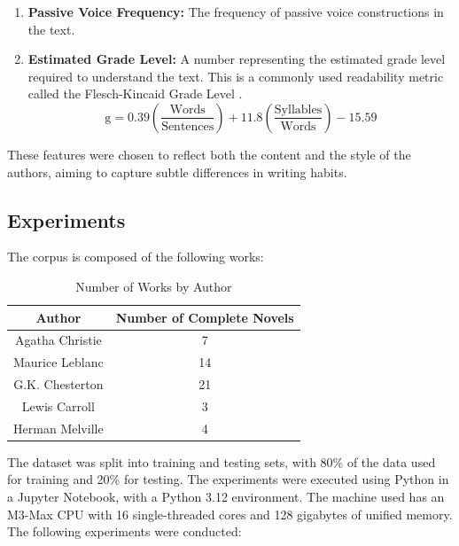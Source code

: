 \documentclass[journal]{IEEEtran} %
\begin{document}
\begin{itemize}
    \begin{enumerate}
        \item \textbf{Passive Voice Frequency:} The frequency of passive voice constructions in the text.
        \item \textbf{Estimated Grade Level:} A number representing the estimated grade level required to understand the text. This is a commonly used readability metric called the Flesch-Kincaid Grade Level \cite{flesch1975}.
        $$
        \text{g} = 0.39 \left(\frac{\text{Words}}{\text{Sentences}}\right) + 11.8 \left(\frac{\text{Syllables}}{\text{Words}}\right) - 15.59
        $$
    \end{enumerate}
\end{itemize}

These features were chosen to reflect both the content and the style of the authors, aiming to capture subtle differences in writing habits.

\subsection{Experiments}

The corpus is composed of the following works:

\begin{table}[htbp]
    \begin{center}
        \begin{tabular}{|c|c|}
            \hline
            \textbf{Author} & \textbf{Number of Complete Novels} \\
            \hline
            \hline
            Agatha Christie & 7 \\
            \hline
            Maurice Leblanc & 14 \\
            \hline
            G.K. Chesterton & 21 \\
            \hline
            Lewis Carroll & 3 \\
            \hline
            Herman Melville & 4 \\
            \hline
        \end{tabular}
        \label{tab1}
    \end{center}
    \caption{Number of Works by Author}
\end{table}

The dataset was split into training and testing sets, with 80\% of the data used for training and 20\% for testing.
The experiments were executed using Python in a Jupyter Notebook, with a Python 3.12 environment. The machine used has an M3-Max CPU with 16 single-threaded cores and 128 gigabytes of unified memory. The following experiments were conducted:
\end{document}
